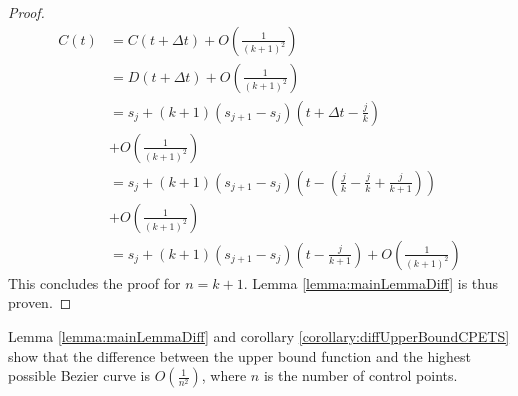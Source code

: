 \begin{proof}
{\begin{equation}
\begin{split}
C(t) &= C(t+\Delta t) + O(\frac{1}{(k+1)^{2}}) \\
&= D(t+\Delta t) + O(\frac{1}{(k+1)^{2}}) \\
&= s_{j}+(k+1)(s_{j+1}-s_{j})(t + \Delta t - \frac{j}{k}) \\
&+ O(\frac{1}{(k+1)^{2}}) \\
&= s_{j}+(k+1)(s_{j+1}-s_{j})(t - (\frac{j}{k} - \frac{j}{k} + \frac{j}{k+1})) \\
&+ O(\frac{1}{(k+1)^{2}}) \\
&= s_{j}+(k+1)(s_{j+1}-s_{j})(t - \frac{j}{k+1}) + O(\frac{1}{(k+1)^{2}})
\label{eq:shiftedInequalityDiff}
\end{split}\end{equation}
}
This concludes the proof for $n=k+1$. Lemma \ref{lemma:mainLemmaDiff} is thus proven.
\end{proof}

Lemma \ref{lemma:mainLemmaDiff} and corollary \ref{corollary:diffUpperBoundCPETS} show that the difference between the upper bound function and the highest possible Bezier curve is $O(\frac{1}{n^{2}})$, where $n$ is the number of control points.

